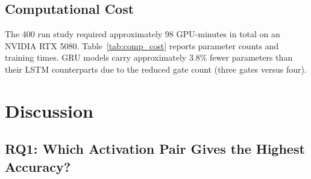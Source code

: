 \documentclass[conference]{IEEEtran}
\begin{document}
\subsection{Computational Cost}

The 400 run study required approximately 98 GPU-minutes in total
on an NVIDIA RTX 5080. Table~\ref{tab:comp_cost} reports parameter
counts and training times. GRU models carry
approximately 3.8\% fewer parameters than their LSTM counterparts
due to the reduced gate count (three gates versus four).

\begin{table}[htbp]
  \caption{Computational Cost Summary}
  \label{tab:comp_cost}
  \centering\footnotesize
  \renewcommand{\arraystretch}{1.1}
\end{table}





\FloatBarrier
\section{Discussion}

\subsection{RQ1: Which Activation Pair Gives the Highest Accuracy?}
\end{document}
